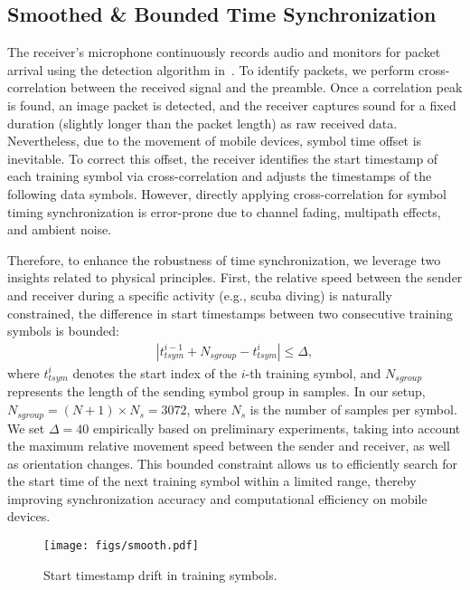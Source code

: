 \subsection{Smoothed \& Bounded Time Synchronization}\label{sec:synchronization}
The receiver's microphone continuously records audio and monitors for packet arrival
using the detection algorithm in~\cite{chen2022underwater}.
To identify packets, we perform cross-correlation between the received signal and
the preamble. Once a correlation peak is found,
an image packet is detected, and the receiver
captures sound for a fixed duration (slightly longer than the packet length)
as raw received data.
Nevertheless, due to the movement of mobile devices, symbol time offset is inevitable. %
To correct this offset, the receiver identifies the start timestamp of each training symbol via cross-correlation and adjusts the timestamps of the following data symbols.
However, directly applying cross-correlation for symbol timing synchronization is error-prone due to channel fading, multipath effects, and
ambient noise.

Therefore, to enhance the robustness of time synchronization,
we leverage two insights related to physical principles.
First, the relative speed between the sender and receiver during a specific
activity (e.g., scuba diving) is naturally constrained, \ie the difference in start timestamps between two consecutive training symbols is bounded:
\begin{align}
    | t_{tsym}^{i-1} + N_{sgroup}- t_{tsym}^{i} |  \leq \Delta,
\end{align}
where $t_{tsym}^{i}$ denotes the start index of the $i$-th training symbol,
and $N_{sgroup}$ represents the length of the sending symbol group in samples.
In our setup, $N_{sgroup} = (N+1) \times N_{s} = 3072$, where $N_{s}$ is the number of samples per symbol.
We set $\Delta = 40$ empirically based on preliminary experiments,
taking into account the maximum relative movement speed between the sender
and receiver, as well as orientation changes.
This bounded constraint allows us to efficiently search for the start
time of the next training symbol within a limited range,
thereby improving synchronization accuracy and computational efficiency
on mobile devices.




\begin{figure}[t]
    \centering
    \texttt{[image: figs/smooth.pdf]}
    \vspace{-20pt} %
    \caption{Start timestamp drift in training symbols.}
    \label{fig:doppler_observation}
\end{figure}

